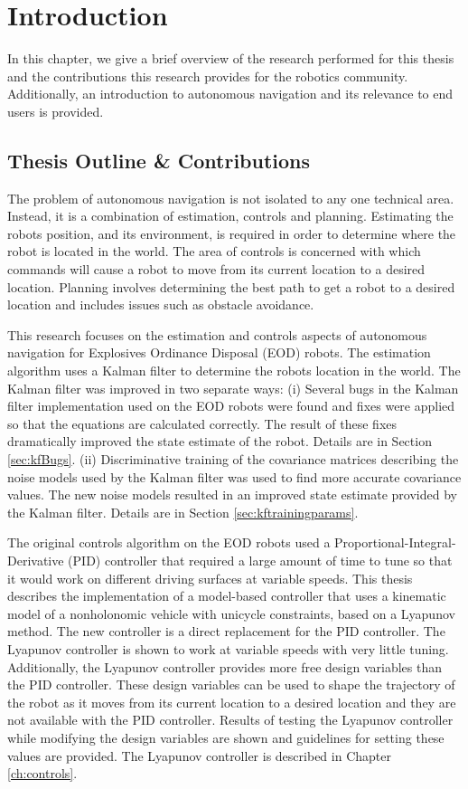 \chapter{Introduction}
\label{ch:introduction}
In this chapter, we give a brief overview of the research performed for this thesis and the contributions this research provides for the robotics community. Additionally, an introduction to autonomous navigation and its relevance to end users is provided.

\section{Thesis Outline \& Contributions}
\label{sec:outline}
The problem of autonomous navigation is not isolated to any one technical area. Instead, it is a combination of estimation, controls and planning. Estimating the robots position, and its environment, is required in order to determine where the robot is located in the world. The area of controls is concerned with which commands will cause a robot to move from its current location to a desired location. Planning involves determining the best path to get a robot to a desired location and includes issues such as obstacle avoidance.

This research focuses on the estimation and controls aspects of autonomous navigation for Explosives Ordinance Disposal (EOD) robots. The estimation algorithm uses a Kalman filter to determine the robots location in the world. The Kalman filter was improved in two separate ways: (i) Several bugs in the Kalman filter implementation used on the EOD robots were found and fixes were applied so that the equations are calculated correctly. The result of these fixes dramatically improved the state estimate of the robot. Details are in Section \ref{sec:kfBugs}. (ii) Discriminative training of the covariance matrices describing the noise models used by the Kalman filter was used to find more accurate covariance values. The new noise models resulted in an improved state estimate provided by the Kalman filter. Details are in Section \ref{sec:kftrainingparams}.

The original controls algorithm on the EOD robots used a Proportional-Integral-Derivative (PID) controller that required a large amount of time to tune so that it would work on different driving surfaces at variable speeds. This thesis describes the implementation of a model-based controller that uses a kinematic model of a nonholonomic vehicle with unicycle constraints, based on a Lyapunov method. The new controller is a direct replacement for the PID controller. The Lyapunov controller is shown to work at variable speeds with very little tuning. Additionally, the Lyapunov controller provides more free design variables than the PID controller. These design variables can be used to shape the trajectory of the robot as it moves from its current location to a desired location and they are not available with the PID controller. Results of testing the Lyapunov controller while modifying the design variables are shown and guidelines for setting these values are provided. The Lyapunov controller is described in Chapter \ref{ch:controls}.

